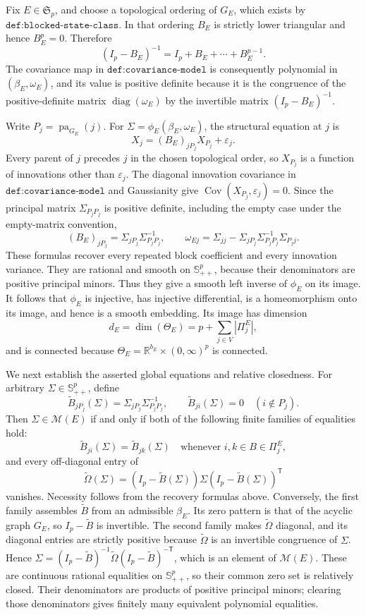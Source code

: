 Fix \(E\in\mathfrak S_p\), and choose a topological ordering of \(G_E\), which exists by \(\texttt{def:blocked-state-class}\). In that ordering \(B_E\) is strictly lower triangular and hence \(B_E^p=0\). Therefore
\[
 (I_p-B_E)^{-1}=I_p+B_E+\cdots+B_E^{p-1}.
\]
The covariance map in \(\texttt{def:covariance-model}\) is consequently polynomial in \((\beta_E,\omega_E)\), and its value is positive definite because it is the congruence of the positive-definite matrix \(\operatorname{diag}(\omega_E)\) by the invertible matrix \((I_p-B_E)^{-1}\).

Write \(P_j=\operatorname{pa}_{G_E}(j)\). For \(\Sigma=\phi_E(\beta_E,\omega_E)\), the structural equation at \(j\) is
\[
 X_j=(B_E)_{jP_j}X_{P_j}+\varepsilon_j.
\]
Every parent of \(j\) precedes \(j\) in the chosen topological order, so \(X_{P_j}\) is a function of innovations other than \(\varepsilon_j\). The diagonal innovation covariance in \(\texttt{def:covariance-model}\) and Gaussianity give \(\operatorname{Cov}(X_{P_j},\varepsilon_j)=0\). Since the principal matrix \(\Sigma_{P_jP_j}\) is positive definite, including the empty case under the empty-matrix convention,
\[
 (B_E)_{jP_j}=\Sigma_{jP_j}\Sigma_{P_jP_j}^{-1},
 \qquad
 \omega_{Ej}=\Sigma_{jj}-\Sigma_{jP_j}\Sigma_{P_jP_j}^{-1}\Sigma_{P_jj}.
\]
These formulas recover every repeated block coefficient and every innovation variance. They are rational and smooth on \(\mathbb S^p_{++}\), because their denominators are positive principal minors. Thus they give a smooth left inverse of \(\phi_E\) on its image. It follows that \(\phi_E\) is injective, has injective differential, is a homeomorphism onto its image, and hence is a smooth embedding. Its image has dimension
\[
 d_E=\dim(\Theta_E)=p+\sum_{j\in V}|\Pi^E_j|,
\]
and is connected because \(\Theta_E=\mathbb R^{b_E}\times(0,\infty)^p\) is connected.

We next establish the asserted global equations and relative closedness. For arbitrary \(\Sigma\in\mathbb S^p_{++}\), define
\[
 \widetilde B_{jP_j}(\Sigma)=\Sigma_{jP_j}\Sigma_{P_jP_j}^{-1},
 \qquad
 \widetilde B_{ji}(\Sigma)=0\quad(i\notin P_j).
\]
Then \(\Sigma\in\mathcal M(E)\) if and only if both of the following finite families of equalities hold:
\[
 \widetilde B_{ji}(\Sigma)=\widetilde B_{jk}(\Sigma)
 \quad\text{whenever }i,k\in B\in\Pi^E_j,
\]
and every off-diagonal entry of
\[
 \widetilde\Omega(\Sigma)
 =(I_p-\widetilde B(\Sigma))\Sigma(I_p-\widetilde B(\Sigma))^{\mathsf T}
\]
vanishes. Necessity follows from the recovery formulas above. Conversely, the first family assembles \(\widetilde B\) from an admissible \(\beta_E\). Its zero pattern is that of the acyclic graph \(G_E\), so \(I_p-\widetilde B\) is invertible. The second family makes \(\widetilde\Omega\) diagonal, and its diagonal entries are strictly positive because \(\widetilde\Omega\) is an invertible congruence of \(\Sigma\). Hence \(\Sigma=(I_p-\widetilde B)^{-1}\widetilde\Omega(I_p-\widetilde B)^{-\mathsf T}\), which is an element of \(\mathcal M(E)\). These are continuous rational equalities on \(\mathbb S^p_{++}\), so their common zero set is relatively closed. Their denominators are products of positive principal minors; clearing those denominators gives finitely many equivalent polynomial equalities.

